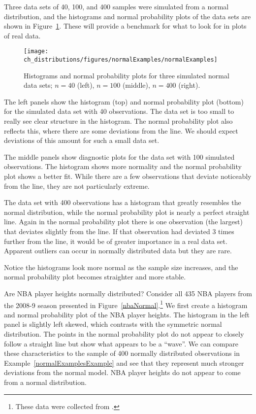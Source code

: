 \begin{example}{Three data sets of 40, 100, and 400 samples were simulated from a normal distribution, and the histograms and normal probability plots of the data sets are shown in Figure~\ref{normalExamples}. These will provide a benchmark for what to look for in plots of real data.} \label{normalExamplesExample}

\begin{figure}
\centering
\texttt{[image: ch\_distributions/figures/normalExamples/normalExamples]}
\caption{Histograms and normal probability plots for three simulated normal data sets; $n=40$ (left), $n=100$ (middle), $n=400$ (right).}
\label{normalExamples}
\end{figure}

The left panels show the histogram (top) and normal probability plot (bottom) for the simulated data set with 40 observations. The data set is too small to really see clear structure in the histogram. The normal probability plot also reflects this, where there are some deviations from the line. We should expect deviations of this amount for such a small data set.

The middle panels show diagnostic plots for the data set with 100 simulated observations. The histogram shows more normality and the normal probability plot shows a better fit. While there are a few observations that deviate noticeably from the line, they are not particularly extreme.

The data set with 400 observations has a histogram that greatly resembles the normal distribution, while the normal probability plot is nearly a perfect straight line. Again in the normal probability plot there is one observation (the largest) that deviates slightly from the line. If that observation had deviated 3 times further from the line, it would be of greater importance in a real data set. Apparent outliers can occur in normally distributed data but they are rare.

Notice the histograms look more normal as the sample size increases, and the normal probability plot becomes straighter and more stable.
\end{example}

\textC{\pagebreak}

\begin{example}{Are NBA player heights normally distributed? Consider all 435 NBA players from the 2008-9 season presented in Figure~\ref{nbaNormal}.\footnote{These data were collected from .}}
We first create a histogram and normal probability plot of the NBA player heights. The histogram in the left panel is slightly left skewed, which contrasts with the symmetric normal distribution. The points in the normal probability plot do not appear to closely follow a straight line but show what appears to be a ``wave''. We can compare these characteristics to the sample of 400 normally distributed observations in Example~\ref{normalExamplesExample} and see that they represent much stronger deviations from the normal model. NBA player heights do not appear to come from a normal distribution.
\end{example}

